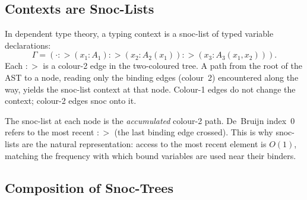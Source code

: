 \documentclass[11pt,a4paper]{article}
\theoremstyle{definition}
\theoremstyle{plain}
\begin{document}
\subsection{Contexts are Snoc-Lists}

In dependent type theory, a typing context is a snoc-list of typed
variable declarations:
\[
\Gamma = (\cdot \mathbin{{:}{>}} (x_1 : A_1) \mathbin{{:}{>}}
  (x_2 : A_2(x_1)) \mathbin{{:}{>}} (x_3 : A_3(x_1, x_2))).
\]
Each ${:}{>}$ is a colour-2 edge in the two-coloured tree. A path from
the root of the AST to a node, reading only the binding edges (colour~2)
encountered along the way, yields the snoc-list context at that node.
Colour-1 edges do not change the context; colour-2 edges snoc onto it.

\begin{center}
\end{center}

The snoc-list at each node is the \emph{accumulated} colour-2 path.
De~Bruijn index~0 refers to the most recent ${:}{>}$ (the last binding
edge crossed). This is why snoc-lists are the natural representation:
access to the most recent element is $O(1)$, matching the frequency
with which bound variables are used near their binders.

\subsection{Composition of Snoc-Trees}
\end{document}
